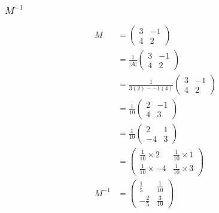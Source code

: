 \documentclass{article}
\begin{document}
\subsubsection{$M^{-1}$}
\begin{align*}
	M  &=
	\begin{pmatrix}
		3 & -1\\
		4 & 2
	\end{pmatrix}
	\\
	&= \frac{1}{|A|}
	\begin{pmatrix}
		3 & -1\\
		4 & 2
	\end{pmatrix}
	\\
	&= \frac{1}{3(2) - -1(4)}
	\begin{pmatrix}
		3 & -1\\
		4 & 2
	\end{pmatrix}
	\\
	&= \frac{1}{10}
	\begin{pmatrix}
		2 & -1\\
		4 & 3
	\end{pmatrix}
	\\
	&= \frac{1}{10}
	\begin{pmatrix}
		2 & 1\\
		-4 & 3
	\end{pmatrix}
	\\
	&=
	\begin{pmatrix}
		\frac{1}{10}\times2 & \frac{1}{10}\times1\\
		\frac{1}{10}\times-4 & \frac{1}{10}\times3
	\end{pmatrix}
	\\
	M^{-1}&=
	\begin{pmatrix}
		\frac{1}{5} & \frac{1}{10}\\
		-\frac{2}{5} & \frac{3}{10}
	\end{pmatrix}
\end{align*}
\end{document}
